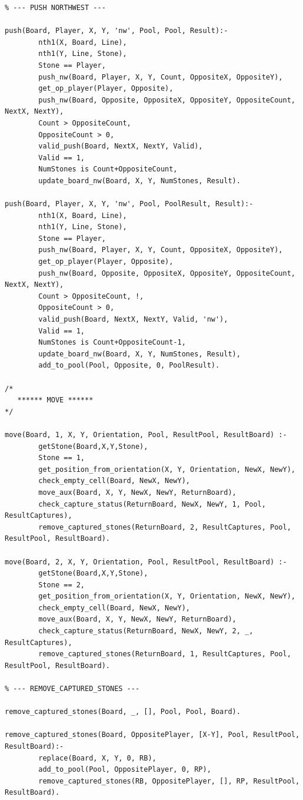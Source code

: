 \documentclass[a4paper]{article}
\begin{document}
\begin{lstlisting}
% --- PUSH NORTHWEST ---

push(Board, Player, X, Y, 'nw', Pool, Pool, Result):- 
        nth1(X, Board, Line),
        nth1(Y, Line, Stone),
        Stone == Player,
        push_nw(Board, Player, X, Y, Count, OppositeX, OppositeY),
        get_op_player(Player, Opposite),
        push_nw(Board, Opposite, OppositeX, OppositeY, OppositeCount, NextX, NextY),
        Count > OppositeCount,
        OppositeCount > 0,
        valid_push(Board, NextX, NextY, Valid),
        Valid == 1,
        NumStones is Count+OppositeCount,
        update_board_nw(Board, X, Y, NumStones, Result).

push(Board, Player, X, Y, 'nw', Pool, PoolResult, Result):- 
        nth1(X, Board, Line),
        nth1(Y, Line, Stone),
        Stone == Player,
        push_nw(Board, Player, X, Y, Count, OppositeX, OppositeY),
        get_op_player(Player, Opposite),
        push_nw(Board, Opposite, OppositeX, OppositeY, OppositeCount, NextX, NextY),
        Count > OppositeCount, !,
        OppositeCount > 0,
        valid_push(Board, NextX, NextY, Valid, 'nw'),
        Valid == 1,
        NumStones is Count+OppositeCount-1,
        update_board_nw(Board, X, Y, NumStones, Result),
        add_to_pool(Pool, Opposite, 0, PoolResult).

/*
   ****** MOVE ******
*/

move(Board, 1, X, Y, Orientation, Pool, ResultPool, ResultBoard) :-
        getStone(Board,X,Y,Stone),
        Stone == 1,
        get_position_from_orientation(X, Y, Orientation, NewX, NewY),
        check_empty_cell(Board, NewX, NewY),
        move_aux(Board, X, Y, NewX, NewY, ReturnBoard),
        check_capture_status(ReturnBoard, NewX, NewY, 1, Pool, ResultCaptures),
        remove_captured_stones(ReturnBoard, 2, ResultCaptures, Pool, ResultPool, ResultBoard).

move(Board, 2, X, Y, Orientation, Pool, ResultPool, ResultBoard) :-
        getStone(Board,X,Y,Stone),
        Stone == 2,
        get_position_from_orientation(X, Y, Orientation, NewX, NewY),
        check_empty_cell(Board, NewX, NewY),
        move_aux(Board, X, Y, NewX, NewY, ReturnBoard),
        check_capture_status(ReturnBoard, NewX, NewY, 2, _, ResultCaptures),
        remove_captured_stones(ReturnBoard, 1, ResultCaptures, Pool, ResultPool, ResultBoard).

% --- REMOVE_CAPTURED_STONES ---

remove_captured_stones(Board, _, [], Pool, Pool, Board).

remove_captured_stones(Board, OppositePlayer, [X-Y], Pool, ResultPool, ResultBoard):-
        replace(Board, X, Y, 0, RB),
        add_to_pool(Pool, OppositePlayer, 0, RP),
        remove_captured_stones(RB, OppositePlayer, [], RP, ResultPool, ResultBoard).


\end{lstlisting}
\end{document}
